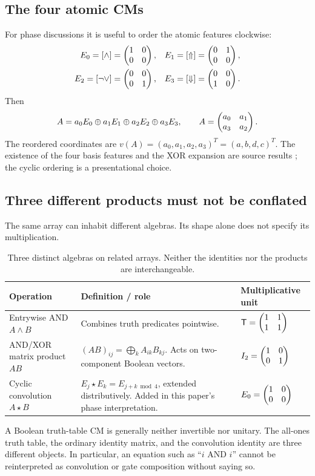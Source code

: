 \subsection{The four atomic CMs}
For phase discussions it is useful to order the atomic features clockwise:
\begin{align}
 E_0=[\land]&=\begin{pmatrix}1&0\\0&0\end{pmatrix},& E_1=[\Uparrow]&=\begin{pmatrix}0&1\\0&0\end{pmatrix},\\
 E_2=[\neg\lor]&=\begin{pmatrix}0&0\\0&1\end{pmatrix},& E_3=[\Downarrow]&=\begin{pmatrix}0&0\\1&0\end{pmatrix}.
\end{align}
Then
\begin{equation}
 A=a_0E_0\oplus a_1E_1\oplus a_2E_2\oplus a_3E_3,
 \qquad A=\begin{pmatrix}a_0&a_1\\a_3&a_2\end{pmatrix}.
\end{equation}
The reordered coordinates are $v(A)=(a_0,a_1,a_2,a_3)^T=(a,b,d,c)^T$. The existence of the four basis features and the XOR expansion are source results \cite[Figure 1 and Section 3.2.1]{droncheff}; the cyclic ordering is a presentational choice.

\subsection{Three different products must not be conflated}
The same array can inhabit different algebras. Its shape alone does not specify its multiplication.
\begin{table}[htbp]
\centering\small
\begin{tabularx}{\textwidth}{@{}L{0.26\textwidth}Y L{0.21\textwidth}@{}}
\toprule
Operation & Definition / role & Multiplicative unit\\
\midrule
Entrywise AND $A\land B$ & Combines truth predicates pointwise. & $\mathsf T=\begin{pmatrix}1&1\\1&1\end{pmatrix}$\\
AND/XOR matrix product $AB$ & $(AB)_{ij}=\bigoplus_k A_{ik}B_{kj}$. Acts on two-component Boolean vectors. & $I_2=\begin{pmatrix}1&0\\0&1\end{pmatrix}$\\
Cyclic convolution $A\star B$ & $E_j\star E_k=E_{j+k\bmod4}$, extended distributively. Added in this paper's phase interpretation. & $E_0=\begin{pmatrix}1&0\\0&0\end{pmatrix}$\\
\bottomrule
\end{tabularx}
\caption{Three distinct algebras on related arrays. Neither the identities nor the products are interchangeable.}
\end{table}
A Boolean truth-table CM is generally neither invertible nor unitary. The all-ones truth table, the ordinary identity matrix, and the convolution identity are three different objects. In particular, an equation such as ``$i$ AND $i$'' cannot be reinterpreted as convolution or gate composition without saying so.


